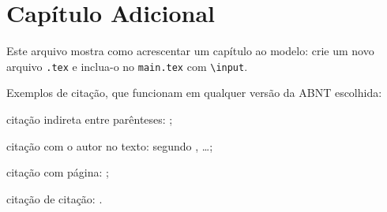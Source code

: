 \chapter{Capítulo Adicional}\label{sec:capitulo-adicional}
Este arquivo mostra como acrescentar um capítulo ao modelo: crie um novo
arquivo \texttt{.tex} e inclua-o no \texttt{main.tex} com \texttt{\textbackslash input}.

Exemplos de citação, que funcionam em qualquer versão da ABNT escolhida:
\begin{alineas}
  \item citação indireta entre parênteses: \cite{Dongen2012};
  \item citação com o autor no texto: segundo , \ldots;
  \item citação com página: \cite[p.~42]{FrankMittelbach111};
  \item citação de citação: .
\end{alineas}
